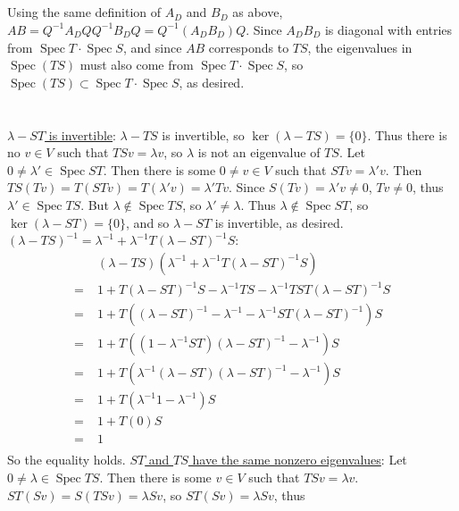 \documentclass[11pt]{article}
\DeclareMathOperator{\spec}{Spec}
\begin{document}
\subsection{} %
Using the same definition of $A_D$ and $B_D$ as above,
$AB=Q^{-1}A_DQQ^{-1}B_DQ=Q^{-1}(A_DB_D)Q$. Since $A_DB_D$ is diagonal with
entries from $\spec T\cdot\spec S$, and since $AB$ corresponds to $TS$, the
eigenvalues in $\spec(TS)$ must also come from $\spec T\cdot\spec S$, so
$\spec(TS)\subset\spec T\cdot\spec S$, as desired.


\section{} %
\underline{$\lambda-ST$ is invertible}:
$\lambda-TS$ is invertible, so $\ker(\lambda-TS)=\{0\}$. Thus there is no
$v\in V$ such that $TSv=\lambda v$, so $\lambda$ is not an eigenvalue of $TS$.
Let $0\neq\lambda'\in\spec ST$. Then there is some $0\neq v\in V$ such that
$STv=\lambda'v$. Then $TS(Tv)=T(STv)=T(\lambda'v)=\lambda'Tv$. Since
$S(Tv)=\lambda'v\neq0$, $Tv\neq0$, thus $\lambda'\in\spec TS$. But
$\lambda\not\in\spec TS$, so $\lambda'\neq\lambda$. Thus $\lambda\not\in\spec ST$,
so $\ker(\lambda-ST)=\{0\}$, and so $\lambda-ST$ is invertible, as desired.
\newline
\newline
\underline{$(\lambda-TS)^{-1}=\lambda^{-1}+\lambda^{-1}T(\lambda-ST)^{-1}S$}:
\begin{align*}
	&(\lambda-TS)(\lambda^{-1}+\lambda^{-1}T(\lambda-ST)^{-1}S)\\
	=\;&1+T(\lambda-ST)^{-1}S-\lambda^{-1}TS-\lambda^{-1}TST(\lambda-ST)^{-1}S\\
	=\;&1+T((\lambda-ST)^{-1}-\lambda^{-1}-\lambda^{-1}ST(\lambda-ST)^{-1})S\\
	=\;&1+T((1-\lambda^{-1}ST)(\lambda-ST)^{-1}-\lambda^{-1})S\\
	=\;&1+T(\lambda^{-1}(\lambda-ST)(\lambda-ST)^{-1}-\lambda^{-1})S\\
	=\;&1+T(\lambda^{-1}1-\lambda^{-1})S\\
	=\;&1+T(0)S\\
	=\;&1\\
\end{align*}
So the equality holds.
\newline
\newline
\underline{$ST$ and $TS$ have the same nonzero eigenvalues}: 
Let $0\neq\lambda\in\spec TS$. Then there is some $v\in V$ such that
$TSv=\lambda v$. $ST(Sv)=S(TSv)=\lambda Sv$, so $ST(Sv)=\lambda Sv$, thus
\end{document}
